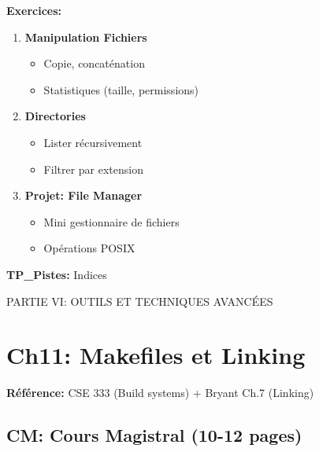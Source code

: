 \documentclass[10pt,a4paper]{article}
\begin{document}
\textbf{Exercices:}
\begin{enumerate}
\item \textbf{Manipulation Fichiers}
   \begin{itemize}
   \item Copie, concaténation
   \item Statistiques (taille, permissions)
   \end{itemize}

\item \textbf{Directories}
   \begin{itemize}
   \item Lister récursivement
   \item Filtrer par extension
   \end{itemize}

\item \textbf{Projet: File Manager}
   \begin{itemize}
   \item Mini gestionnaire de fichiers
   \item Opérations POSIX
   \end{itemize}
\end{enumerate}

\textbf{TP\_Pistes:} Indices

\newpage

\begin{partbox}
PARTIE VI: OUTILS ET TECHNIQUES AVANCÉES
\end{partbox}

\section{Ch11: Makefiles et Linking}

\textbf{Référence:} CSE 333 (Build systems) + Bryant Ch.7 (Linking)

\subsection*{CM: Cours Magistral (10-12 pages)}
\end{document}
